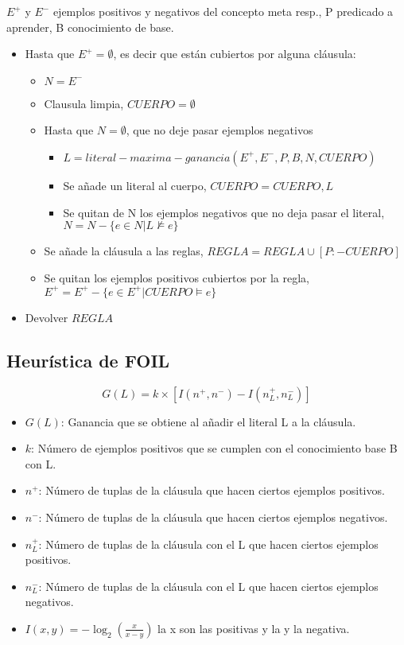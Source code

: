 \documentclass[12pt, twoside, openright]{report} %
\begin{document}
$E^+$ y $E^-$ ejemplos positivos y negativos del concepto meta resp., P predicado a aprender, B conocimiento de base.
\begin{itemize}
	\item Hasta que $E^+ = \emptyset$, es decir que están cubiertos por alguna cláusula:
	      \begin{itemize}
		      \item $N = E^-$
		      \item Clausula limpia, $CUERPO = \emptyset$
		      \item Hasta que $N = \emptyset$, que no deje pasar ejemplos negativos
		            \begin{itemize}
			            \item $L = literal-maxima-ganancia(E^+, E^-, P, B, N, CUERPO)$
			            \item Se añade un literal al cuerpo, $CUERPO = CUERPO, L$
			            \item Se quitan de N los ejemplos negativos que no deja pasar el literal, $N = N - \{e \in N | L \nvDash e\}$
		            \end{itemize}
		      \item Se añade la cláusula a las reglas, $REGLA = REGLA \cup [P:-CUERPO]$
		      \item Se quitan los ejemplos positivos cubiertos por la regla, $E^+ = E^+ - \{e \in E^+ | CUERPO \vDash e\}$
	      \end{itemize}
	\item Devolver $REGLA$
\end{itemize}
\pagebreak
\subsection{Heurística de FOIL}
$$G(L)=k\times [I(n^+,n^-)-I(n^+_L, n^-_L)]$$
\begin{itemize}
	\item $G(L)$: Ganancia que se obtiene al añadir el literal L a la cláusula.
	\item $k$: Número de ejemplos positivos que se cumplen con el conocimiento base B con L.
	\item $n^+$: Número de tuplas de la cláusula que hacen ciertos ejemplos positivos.
	\item $n^-$: Número de tuplas de la cláusula que hacen ciertos ejemplos negativos.
	\item $n^+_L$: Número de tuplas de la cláusula con el L que hacen ciertos ejemplos positivos.
	\item $n^-_L$: Número de tuplas de la cláusula con el L que hacen ciertos ejemplos negativos.
	\item $I(x, y)=-\log_2 \left( \frac{x}{x-y} \right)$ la x son las positivas y la y la negativa.
\end{itemize}
\end{document}
